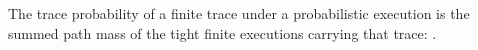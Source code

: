 \begin{definition}
  \label{def:traceprob}
  \leanok
  The trace probability of a finite trace under a probabilistic execution is the summed path mass of the tight finite executions carrying that trace: .
\end{definition}
